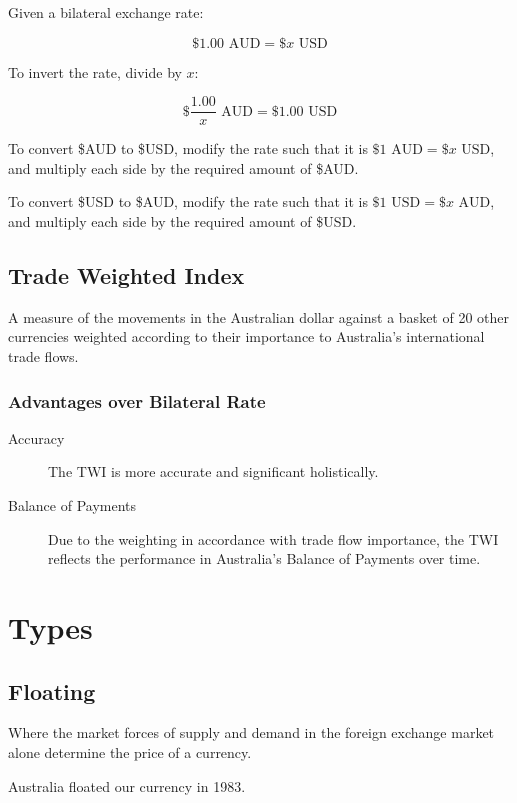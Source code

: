 \documentclass[a4paper,11pt]{article}
\begin{document}
Given a bilateral exchange rate:

$$
\$1.00\text{ AUD} = \$x \text{ USD}
$$

To invert the rate, divide by $x$:

$$
\$\frac{1.00}{x}\text{ AUD} = \$1.00\text{ USD}
$$

To convert \$AUD to \$USD, modify the rate such that it is
$\$1\text{ AUD} = \$x\text{ USD}$, and multiply each side by the required
amount of \$AUD.

To convert \$USD to \$AUD, modify the rate such that it is
$\$1\text{ USD} = \$x\text{ AUD}$, and multiply each side by the required
amount of \$USD.


\subsection{Trade Weighted Index}

A measure of the movements in the Australian dollar against a basket of 20
other currencies weighted according to their importance to Australia's
international trade flows.


\subsubsection{Advantages over Bilateral Rate}

\begin{description}
\item [Accuracy] The TWI is more accurate and significant holistically.
\item [Balance of Payments] Due to the weighting in accordance with trade flow
	importance, the TWI reflects the performance in Australia's Balance of
	Payments over time.
\end{description}




\section{Types}

\subsection{Floating}

Where the market forces of supply and demand in the foreign exchange market
alone determine the price of a currency.

Australia floated our currency in 1983.
\end{document}
